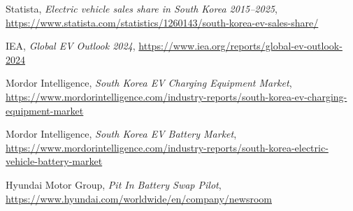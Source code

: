 \documentclass[12pt,a4paper]{article}
\begin{document}


\begin{thebibliography}{9}
 Statista, \emph{Electric vehicle sales share in South Korea 2015–2025}, \url{https://www.statista.com/statistics/1260143/south-korea-ev-sales-share/}

 IEA, \emph{Global EV Outlook 2024}, \url{https://www.iea.org/reports/global-ev-outlook-2024}

 Mordor Intelligence, \emph{South Korea EV Charging Equipment Market}, \url{https://www.mordorintelligence.com/industry-reports/south-korea-ev-charging-equipment-market}

 Mordor Intelligence, \emph{South Korea EV Battery Market}, \url{https://www.mordorintelligence.com/industry-reports/south-korea-electric-vehicle-battery-market}

 Hyundai Motor Group, \emph{Pit In Battery Swap Pilot}, \url{https://www.hyundai.com/worldwide/en/company/newsroom}
\end{thebibliography}
\end{document}
